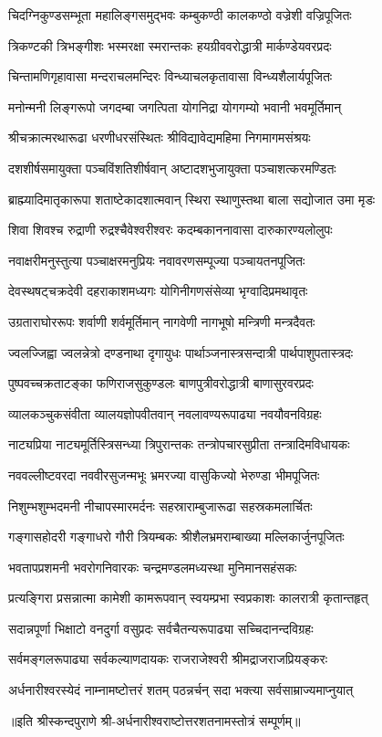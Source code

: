 \twolineshloka
{चिदग्निकुण्डसम्भूता महालिङ्गसमुद्भवः}
{कम्बुकण्ठी कालकण्ठो वज्रेशी वज्रिपूजितः}%

\twolineshloka
{त्रिकण्टकी त्रिभङ्गीशः भस्मरक्षा स्मरान्तकः}
{हयग्रीववरोद्धात्री मार्कण्डेयवरप्रदः}%

\twolineshloka
{चिन्तामणिगृहावासा मन्दराचलमन्दिरः}
{विन्ध्याचलकृतावासा विन्ध्यशैलार्यपूजितः}%

\twolineshloka
{मनोन्मनी लिङ्गरूपो जगदम्बा जगत्पिता}
{योगनिद्रा योगगम्यो भवानी भवमूर्तिमान्}%

\twolineshloka
{श्रीचक्रात्मरथारूढा धरणीधरसंस्थितः}
{श्रीविद्यावेद्यमहिमा निगमागमसंश्रयः}%

\twolineshloka
{दशशीर्षसमायुक्ता पञ्चविंशतिशीर्षवान्}
{अष्टादशभुजायुक्ता पञ्चाशत्करमण्डितः}%

\twolineshloka
{ब्राह्म्यादिमातृकारूपा शताष्टेकादशात्मवान्}
{स्थिरा स्थाणुस्तथा बाला सद्योजात उमा मृडः}%

\twolineshloka
{शिवा शिवश्च रुद्राणी रुद्रश्चैवेश्वरीश्वरः}
{कदम्बकाननावासा दारुकारण्यलोलुपः}%

\twolineshloka
{नवाक्षरीमनुस्तुत्या पञ्चाक्षरमनुप्रियः}
{नवावरणसम्पूज्या पञ्चायतनपूजितः}%

\twolineshloka
{देवस्थषट्चक्रदेवी दहराकाशमध्यगः}
{योगिनीगणसंसेव्या भृग्वादिप्रमथावृतः}%

\twolineshloka
{उग्रताराघोररूपः शर्वाणी शर्वमूर्तिमान्}
{नागवेणी नागभूषो मन्त्रिणी मन्त्रदैवतः}%

\twolineshloka
{ज्वलज्जिह्वा ज्वलन्नेत्रो दण्डनाथा दृगायुधः}
{पार्थाञ्जनास्त्रसन्दात्री पार्थपाशुपतास्त्रदः}%

\twolineshloka
{पुष्पवच्चक्रताटङ्का फणिराजसुकुण्डलः}
{बाणपुत्रीवरोद्धात्री बाणासुरवरप्रदः}%

\twolineshloka
{व्यालकञ्चुकसंवीता व्यालयज्ञोपवीतवान्}
{नवलावण्यरूपाढ्या नवयौवनविग्रहः}%

\twolineshloka
{नाट्यप्रिया नाट्यमूर्तिस्त्रिसन्ध्या त्रिपुरान्तकः}
{तन्त्रोपचारसुप्रीता तन्त्रादिमविधायकः}%

\twolineshloka
{नववल्लीष्टवरदा नववीरसुजन्मभूः}
{भ्रमरज्या वासुकिज्यो भेरुण्डा भीमपूजितः}%

\twolineshloka
{निशुम्भशुम्भदमनी नीचापस्मारमर्दनः}
{सहस्राराम्बुजारूढा सहस्रकमलार्चितः}%

\twolineshloka
{गङ्गासहोदरी गङ्गाधरो गौरी त्रियम्बकः}
{श्रीशैलभ्रमराम्बाख्या मल्लिकार्जुनपूजितः}%

\twolineshloka
{भवतापप्रशमनी भवरोगनिवारकः}
{चन्द्रमण्डलमध्यस्था मुनिमानसहंसकः}%

\twolineshloka
{प्रत्यङ्गिरा प्रसन्नात्मा कामेशी कामरूपवान्}
{स्वयम्प्रभा स्वप्रकाशः कालरात्री कृतान्तहृत्}%

\twolineshloka
{सदान्नपूर्णा भिक्षाटो वनदुर्गा वसुप्रदः}
{सर्वचैतन्यरूपाढ्या सच्चिदानन्दविग्रहः}%

\twolineshloka
{सर्वमङ्गलरूपाढ्या सर्वकल्याणदायकः}
{राजराजेश्वरी श्रीमद्राजराजप्रियङ्करः}%

\twolineshloka
{अर्धनारीश्वरस्येदं नाम्नामष्टोत्तरं शतम्}
{पठन्नर्चन् सदा भक्त्या सर्वसाम्राज्यमाप्नुयात्}%

॥इति श्रीस्कन्दपुराणे श्री-अर्धनारीश्वराष्टोत्तरशतनामस्तोत्रं सम्पूर्णम्॥